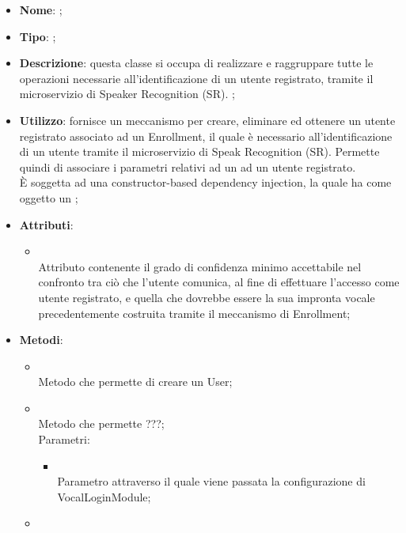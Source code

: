 \begin{itemize}
	\item \textbf{Nome}: ;
	\item \textbf{Tipo}: ;
	\item \textbf{Descrizione}: questa classe si occupa di realizzare e raggruppare tutte le operazioni necessarie all'identificazione di un utente registrato, tramite il microservizio di Speaker Recognition (SR). ;
	\item \textbf{Utilizzo}: fornisce un meccanismo per creare, eliminare ed ottenere un utente registrato associato ad un Enrollment, il quale è necessario all'identificazione di un utente tramite il microservizio di Speak Recognition (SR). Permette quindi di associare i parametri relativi ad un  ad un utente registrato.\\
È soggetta ad una constructor-based dependency injection, la quale ha come oggetto un ;
	\item \textbf{Attributi}:
	\begin{itemize}
		\item[]  \\
		Attributo contenente il grado di confidenza minimo accettabile nel confronto tra ciò che l'utente comunica, al fine di effettuare l'accesso come utente registrato, e quella che dovrebbe essere la sua impronta vocale precedentemente costruita tramite il meccanismo di Enrollment;
	\end{itemize}
	\item \textbf{Metodi}:
	\begin{itemize}
		\item[]  \\
		Metodo che permette di creare un User;\\
		\item[]  \\
		Metodo che permette ???;\\
		Parametri:
		\begin{itemize}
			\item {} \\
			Parametro attraverso il quale viene passata la configurazione di VocalLoginModule;
		\end{itemize}
		\item[]  \\

\end{itemize}
\end{itemize}
